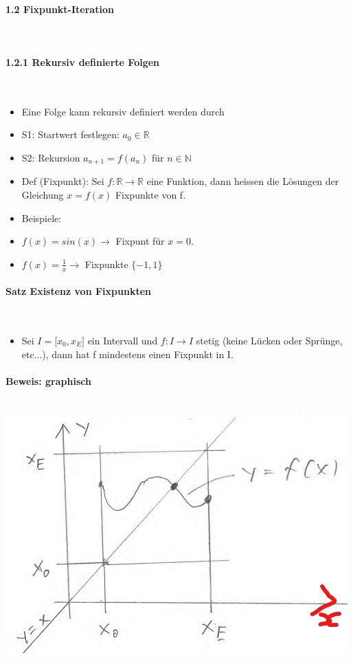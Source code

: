 \paragraph{1.2 Fixpunkt-Iteration}\mbox{}\\
\paragraph{1.2.1 Rekursiv definierte Folgen}\mbox{}\\
\begin{itemize}
	\item Eine Folge kann rekursiv definiert werden durch
	\item S1: Startwert festlegen: $a_0 \in \mathbb{R}$
	\item S2: Rekursion $a_{n+1} = f(a_n)$ für $n \in \mathbb{N}$
	\item Def (Fixpunkt): \linebreak
          Sei $f: \mathbb{R} \rightarrow \mathbb{R}$ eine Funktion, dann heissen die Lösungen der Gleichung\linebreak
          $x = f(x)$ Fixpunkte von f.
    \item Beispiele:
    \item $f(x) = sin(x) \rightarrow$ Fixpunt für $x = 0$.
    \item $f(x) = \frac{1}{x} \rightarrow$ Fixpunkte $\{ -1,1 \}$
\end{itemize}

\paragraph{Satz Existenz von Fixpunkten}\mbox{}\\
\begin{itemize}
	\item Sei $I = \lbrack x_0, x_E \rbrack$ ein Intervall und $f: I \rightarrow I$ stetig (keine Lücken oder Sprünge, etc...), dann hat f mindestens einen Fixpunkt in I.
\end{itemize}


\paragraph{Beweis: graphisch}\mbox{}\\
\noindent
\includegraphics[width=\columnwidth]{./images/beweis_fixpunkt.png}
